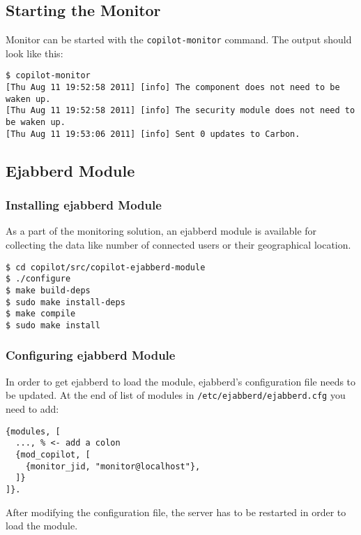 \subsection{Starting the Monitor}

Monitor can be started with the \texttt{copilot-monitor} command. The output should look like this:
\lstset{caption=Starting \copilot Monitor}
\begin{lstlisting}
$ copilot-monitor
[Thu Aug 11 19:52:58 2011] [info] The component does not need to be waken up.
[Thu Aug 11 19:52:58 2011] [info] The security module does not need to be waken up.
[Thu Aug 11 19:53:06 2011] [info] Sent 0 updates to Carbon.
\end{lstlisting}

\subsection{Ejabberd Module}

\subsubsection{Installing ejabberd Module}

As a part of the monitoring solution, an ejabberd module is available for collecting the data like number of connected users or their geographical location.
\lstset{caption=Installing ejabberd module}
\begin{lstlisting}
$ cd copilot/src/copilot-ejabberd-module
$ ./configure
$ make build-deps
$ sudo make install-deps
$ make compile
$ sudo make install
\end{lstlisting}

\subsubsection{Configuring ejabberd Module}

In order to get ejabberd to load the module, ejabberd's configuration file needs to be updated. At the end of list of modules in \texttt{/etc/ejabberd/ejabberd.cfg} you need to add:
\lstset{caption=Updated ejabberd.cfg}
\begin{lstlisting}
{modules, [
  ..., % <- add a colon
  {mod_copilot, [
    {monitor_jid, "monitor@localhost"},
  ]}
]}.
\end{lstlisting}

After modifying the configuration file, the server has to be restarted in order to load the module.

